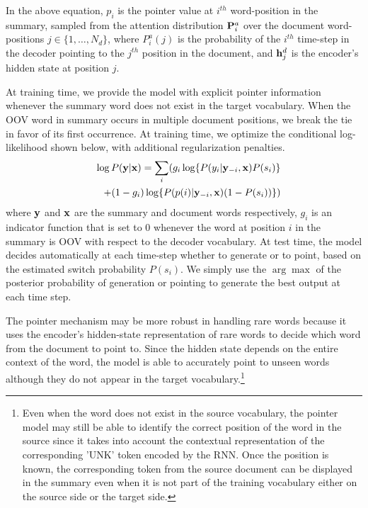 In the above equation, $p_i$ is the pointer value at $i^{th}$ word-position in the summary, sampled from the attention distribution ${\bf P}^a_i$ over the document word-positions $j \in \{1,\ldots,N_d\}$, where $P^a_i(j)$ is the probability of the $i^{th}$ time-step in the decoder pointing to the $j^{th}$ position in the document, and ${\bf h}^d_j$ is the encoder's hidden state at position $j$. %

At training time, we provide the model with explicit pointer information whenever the summary word does not exist in the target vocabulary. When the OOV word in summary occurs in multiple document positions, we break the tie in favor of its first occurrence. At training time, we optimize the conditional log-likelihood shown below, with additional regularization penalties.
\begin{eqnarray}
&& \log P({\bf y}|{\bf x}) = \sum_i (g_i\log \{P(y_i | {\bf y}_{-i}, {\bf x})P(s_i)\} \nonumber\\
 &&+  (1-g_i)\log\{P(p(i)|{\bf y}_{-i},{\bf x})(1-P(s_i))\})\nonumber
\end{eqnarray}
where ${\bf y}$ and ${\bf x}$ are the summary and document words respectively, $g_i$ is an indicator function that is set to 0 whenever the word at position $i$ in the summary is OOV with respect to the decoder vocabulary. At test time, the model decides automatically at each time-step whether to generate or to point, based on the estimated switch probability $P(s_i)$.  We simply use the $\arg\max $ of the posterior probability of generation or pointing to generate the best output at each time step.

The pointer mechanism may be more robust in handling rare words because it uses the encoder's hidden-state representation of rare words to decide which word from the document to point to. Since the hidden state depends on the entire context of the word, the model is able to accurately point to unseen words although they do not appear in the target vocabulary.\footnote{Even when the word does not exist in the source vocabulary, the pointer model may still be able to identify the correct position of the word in the source since it takes into account the contextual representation of the corresponding 'UNK' token encoded by the RNN. Once the position is known, the corresponding token from the source document can be displayed in the summary even when it is not part of the training vocabulary either on the source side or the target side.}  %


